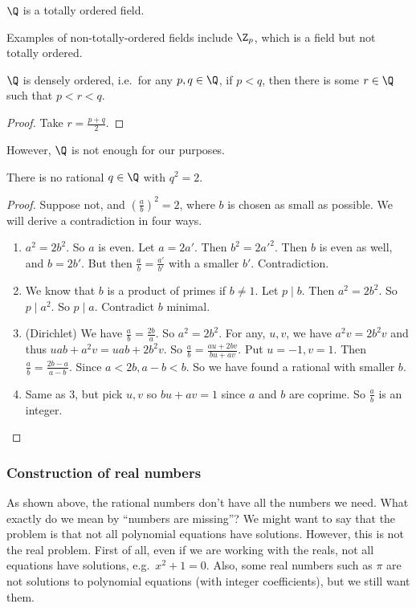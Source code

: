 \documentclass[a4paper]{article}
\begin{document}
\begin{prop}
  $\Q$ is a totally ordered field.
\end{prop}

Examples of non-totally-ordered fields include $\Z_p$, which is a field but not totally ordered.
\begin{prop}
  $\Q$ is densely ordered, i.e.\ for any $p, q \in \Q$, if $p < q$, then there is some $r \in \Q$ such that $p < r < q$.
\end{prop}
\begin{proof}
  Take $r = \frac{p + q}{2}$.
\end{proof}

However, $\Q$ is not enough for our purposes.
\begin{prop}
  There is no rational $q\in \Q$ with $q^2 = 2$.
\end{prop}

\begin{proof}
  Suppose not, and $(\frac{a}{b})^2 = 2$, where $b$ is chosen as small as possible. We will derive a contradiction in four ways.
  \begin{enumerate}
    \item $a^2 = 2b^2$. So $a$ is even. Let $a = 2a'$. Then $b^2 = 2a'^2$. Then $b$ is even as well, and $b = 2b'$. But then $\frac{a}{b} = \frac{a'}{b'}$ with a smaller $b'$. Contradiction.
    \item We know that $b$ is a product of primes if $b \not= 1$. Let $p \mid b$. Then $a^2 = 2b^2$. So $p \mid a^2$. So $p \mid a$. Contradict $b$ minimal.
    \item (Dirichlet) We have $\frac{a}{b} = \frac{2b}{a}$. So $a^2 = 2b^2$. For any, $u, v$, we have $a^2v = 2b^2v$ and thus $uab + a^2v = uab + 2b^2v$. So $\frac{a}{b} = \frac{au + 2bv}{bu + av}$. Put $u = -1, v = 1$. Then $\frac{a}{b} = \frac{2b - a}{a - b}$. Since $a < 2b, a - b < b$. So we have found a rational with smaller $b$.
    \item Same as 3, but pick $u, v$ so $bu + av = 1$ since $a$ and $b$ are coprime. So $\frac{a}{b}$ is an integer.\qedhere
  \end{enumerate}
\end{proof}

\subsubsection*{Construction of real numbers}
As shown above, the rational numbers don't have all the numbers we need. What exactly do we mean by ``numbers are missing''? We might want to say that the problem is that not all polynomial equations have solutions. However, this is not the real problem. First of all, even if we are working with the reals, not all equations have solutions, e.g.\ $x^2 + 1 = 0$. Also, some real numbers such as $\pi$ are not solutions to polynomial equations (with integer coefficients), but we still want them.
\end{document}
